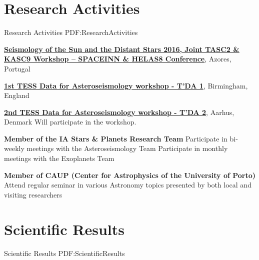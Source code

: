\documentclass[letterpaper,10pt,oneside]{article}
\begin{document}
\begin{body}



\section
{Research Activities}
{Research Activities}
{PDF:ResearchActivities}

\href{http://www.iastro.pt/research/conferences/spacetk16/}
{\textbf{Seismology of the Sun and the Distant Stars 2016, Joint TASC2 \& KASC9 Workshop – SPACEINN \& HELAS8 Conference}},
Azores, Portugal
\hfill
{}

\BigGap
\href{http://sac.au.dk/currently/tess-data-for-asteroseismology-workshop/}
{\textbf{1st TESS Data for Asteroseismology workshop - T'DA 1}},
Birmingham, England
\hfill
{}

\BigGap
\href{http://sac.au.dk/currently/2nd-tess-data-for-asteroseismology-workshop/}
{\textbf{2nd TESS Data for Asteroseismology workshop - T'DA 2}},
Aarhus, Denmark
\hfill
{}
\GapNoBreak
\BulletItem
Will participate in the workshop.

\BigGap
\textbf{Member of the IA Stars \& Planets Research Team}
\GapNoBreak
\BulletItem
Participate in bi-weekly meetings with the Asteroseismology Team
\GapNoBreak
\BulletItem
Participate in monthly meetings with the Exoplanets Team

\BigGap
\textbf{Member of CAUP (Center for Astrophysics of the University of Porto)}
\GapNoBreak
\BulletItem
Attend regular seminar in various Astronomy topics presented by both local and visiting researchers


\section
{Scientific Results}
{Scientific Results}
{PDF:ScientificResults}



\end{body}
\end{document}

